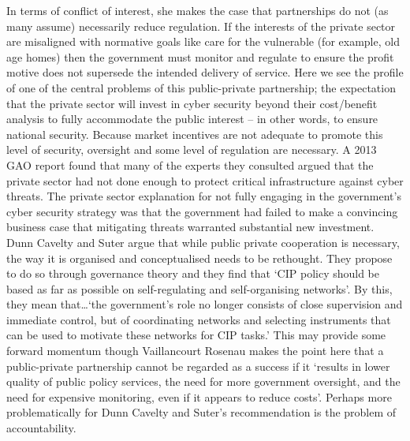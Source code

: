 \documentclass[a4paper,11pt]{article}
\begin{document}
In terms of conflict of interest, she makes the case that partnerships
do not (as many assume) necessarily reduce regulation. If the
interests of the private sector are misaligned with normative goals
like care for the vulnerable (for example, old age homes) then the
government must monitor and regulate to ensure the profit motive does
not supersede the intended delivery of service.  Here we see the
profile of one of the central problems of this public-private
partnership; the expectation that the private sector will invest in
cyber security beyond their cost/benefit analysis to fully accommodate
the public interest -- in other words, to ensure national
security. Because market incentives are not adequate to promote this
level of security, oversight and some level of regulation are
necessary. A 2013 GAO report found that many of the experts they
consulted argued that the private sector had not done enough to
protect critical infrastructure against cyber threats. The private
sector explanation for not fully engaging in the government’s cyber
security strategy was that the government had failed to make a
convincing business case that mitigating threats warranted substantial
new investment.  Dunn Cavelty and Suter argue that while public
private cooperation is necessary, the way it is organised and
conceptualised needs to be rethought. They propose to do so through
governance theory and they find that `CIP policy should be based as
far as possible on self-regulating and self-organising networks'. By
this, they mean that…`the government’s role no longer consists of
close supervision and immediate control, but of coordinating networks
and selecting instruments that can be used to motivate these networks
for CIP tasks.' This may provide some forward momentum though
Vaillancourt Rosenau makes the point here that a public-private
partnership cannot be regarded as a success if it `results in lower
quality of public policy services, the need for more government
oversight, and the need for expensive monitoring, even if it appears
to reduce costs'. Perhaps more problematically for Dunn Cavelty and
Suter’s recommendation is the problem of accountability.
\end{document}

